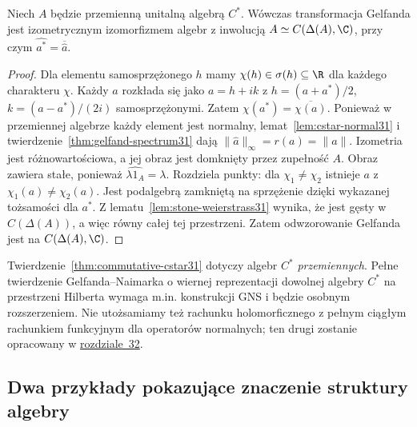 \begin{twierdzenie}
\label{thm:commutative-cstar31}
Niech $A$ będzie przemienną unitalną algebrą $C^*$.
Wówczas transformacja Gelfanda jest izometrycznym izomorfizmem
algebr z inwolucją
$A\simeq C(\Delta(A),\C)$,
przy czym $\widehat{a^*}=\overline{\widehat a}$.
\end{twierdzenie}
\begin{proof}
Dla elementu samosprzężonego $h$ mamy
$\chi(h)\in\sigma(h)\subseteq\R$ dla każdego charakteru $\chi$.
Każdy $a$ rozkłada się jako $a=h+ik$ z
$h=(a+a^*)/2$, $k=(a-a^*)/(2i)$ samosprzężonymi.
Zatem $\chi(a^*)=\overline{\chi(a)}$.
Ponieważ w przemiennej algebrze każdy element jest normalny,
lemat~\ref{lem:cstar-normal31} i twierdzenie~\ref{thm:gelfand-spectrum31}
dają $\|\widehat a\|_\infty=r(a)=\|a\|$.
Izometria jest różnowartościowa, a jej obraz jest domknięty
przez zupełność $A$. Obraz zawiera stałe, ponieważ
$\widehat{\lambda1_A}=\lambda$. Rozdziela punkty:
dla $\chi_1\ne\chi_2$ istnieje $a$ z
$\chi_1(a)\ne\chi_2(a)$. Jest podalgebrą zamkniętą
na sprzężenie dzięki wykazanej tożsamości dla $a^*$.
Z lematu~\ref{lem:stone-weierstrass31} wynika,
że jest gęsty w $C(\Delta(A))$, a więc równy całej tej przestrzeni.
Zatem odwzorowanie Gelfanda jest na $C(\Delta(A),\C)$.
\end{proof}

\begin{uwaga}
Twierdzenie~\ref{thm:commutative-cstar31} dotyczy algebr $C^*$
\emph{przemiennych}. Pełne twierdzenie Gelfanda--Naimarka o
wiernej reprezentacji dowolnej algebry $C^*$ na przestrzeni Hilberta
wymaga m.in. konstrukcji GNS i będzie osobnym rozszerzeniem.
Nie utożsamiamy też rachunku holomorficznego z pełnym
ciągłym rachunkiem funkcyjnym dla operatorów normalnych;
ten drugi zostanie opracowany w \hyperref[sec:spectral-hilbert32]{rozdziale~32}.
\end{uwaga}


\subsection{Dwa przykłady pokazujące znaczenie struktury algebry}

